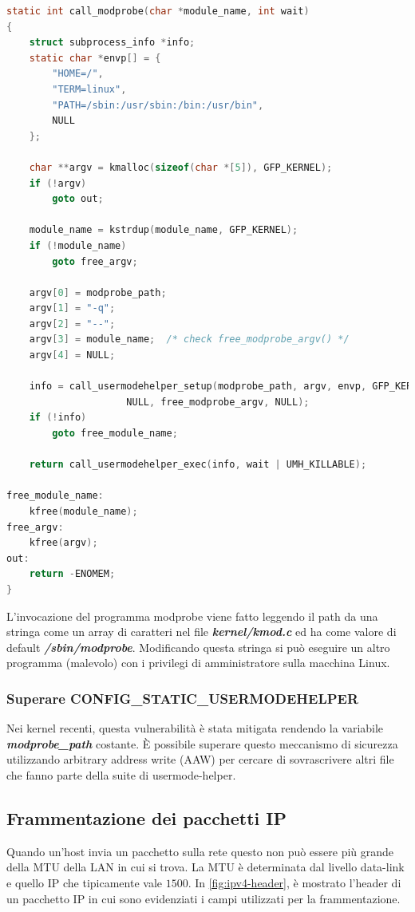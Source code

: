 \documentclass{article}
\begin{document}
\begin{lstlisting}[language=C,style=CStyle,caption="Invocazione del programma modprobe per la gestione dei programmi dal formato sconosciuto"]
static int call_modprobe(char *module_name, int wait)
{
	struct subprocess_info *info;
	static char *envp[] = {
		"HOME=/",
		"TERM=linux",
		"PATH=/sbin:/usr/sbin:/bin:/usr/bin",
		NULL
	};

	char **argv = kmalloc(sizeof(char *[5]), GFP_KERNEL);
	if (!argv)
		goto out;

	module_name = kstrdup(module_name, GFP_KERNEL);
	if (!module_name)
		goto free_argv;

	argv[0] = modprobe_path;
	argv[1] = "-q";
	argv[2] = "--";
	argv[3] = module_name;	/* check free_modprobe_argv() */
	argv[4] = NULL;

	info = call_usermodehelper_setup(modprobe_path, argv, envp, GFP_KERNEL,
					 NULL, free_modprobe_argv, NULL);
	if (!info)
		goto free_module_name;

	return call_usermodehelper_exec(info, wait | UMH_KILLABLE);

free_module_name:
	kfree(module_name);
free_argv:
	kfree(argv);
out:
	return -ENOMEM;
} 
\end{lstlisting}

L'invocazione del programma modprobe viene fatto leggendo il path da una stringa 
come un array di caratteri nel file \textbf{\textit{kernel/kmod.c}} ed ha come valore di 
default \textbf{\textit{/sbin/modprobe}}. Modificando questa stringa si può eseguire un 
altro programma (malevolo) con i privilegi di amministratore sulla macchina Linux. 

\subsubsection{Superare CONFIG\_STATIC\_USERMODEHELPER}
Nei kernel recenti, questa vulnerabilità è stata mitigata rendendo la variabile \textbf{\textit{modprobe\_path}} 
costante. È possibile superare questo meccanismo di sicurezza utilizzando arbitrary address write 
(AAW) per cercare di sovrascrivere altri file che fanno parte della suite di usermode-helper. 

\subsection{Frammentazione dei pacchetti IP}
Quando un'host invia un pacchetto sulla rete questo non può essere più grande della MTU 
della LAN in cui si trova. La MTU è determinata dal livello data-link e quello IP che 
tipicamente vale $1500$. In \cref{fig:ipv4-header}, è mostrato l'header di un pacchetto IP in cui sono 
evidenziati i campi utilizzati per la frammentazione. 
\end{document}
